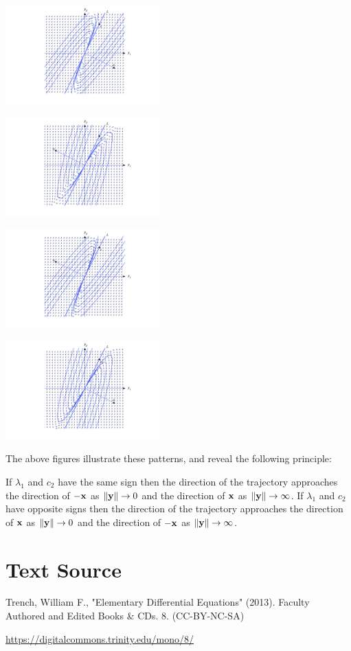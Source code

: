\documentclass{ximera}
\begin{document}
\begin{image}
 \includegraphics[height=1.5in]{fig100502.jpg} 
\end{image}

\begin{image}
 \includegraphics[height=1.5in]{fig100503.jpg} 
\end{image}

\begin{image}
 \includegraphics[height=1.5in]{fig100504.jpg} 
\end{image}

\begin{image}
 \includegraphics[height=1.5in]{fig100505.jpg} 
\end{image}

The above figures illustrate these patterns, and
reveal the following principle:
\begin{observation}
If $\lambda_1$ and $c_2$ have the same sign then the
direction of
the trajectory approaches the direction of $-{\bf x}$ as $\left\lVert{\bf y}\right\rVert\rightarrow 0$ and the direction of ${\bf x}$ as $\left\lVert{\bf y}\right\rVert\rightarrow\infty$. If
$\lambda_1$ and $c_2$ have opposite signs then the direction of the
trajectory approaches the direction of ${\bf x}$ as $\left\lVert{\bf y}\right\rVert\rightarrow0$
and the direction of $-{\bf x}$ as $\left\lVert{\bf y}\right\rVert\rightarrow\infty$.
\end{observation}




\section*{Text Source}
Trench, William F., "Elementary Differential Equations" (2013). Faculty Authored and Edited Books \& CDs. 8. (CC-BY-NC-SA)

\href{https://digitalcommons.trinity.edu/mono/8/}{https://digitalcommons.trinity.edu/mono/8/}
\end{document}
